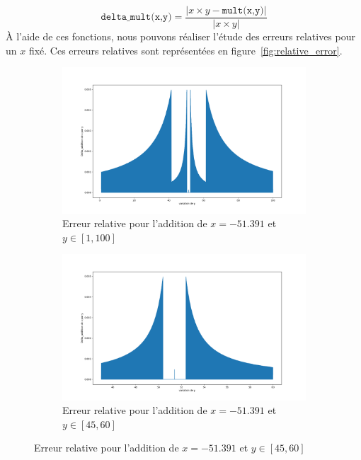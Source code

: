 \documentclass{article}
\begin{document}
\begin{equation}
  \texttt{delta\_mult(x,y)} = \dfrac{\big\vert x \times y - \texttt{mult(x,y)} \big\vert}{\big\vert x\times y \big\vert}
  \label{eq:delta_mult}
\end{equation}
À l'aide de ces fonctions, nous pouvons réaliser l'étude des erreurs relatives pour un $x$ fixé. Ces erreurs relatives sont représentées en figure~\ref{fig:relative_error}.
\vskip 1mm ~

\begin{figure}[ht]
  \centering
  \begin{subfigure}[b]{0.5\textwidth}
    \centering
    \includegraphics[width=\linewidth]{Partie1-delta_add_1-100.png}
    \caption{Erreur relative pour l'addition de $x = -51.391$ et $y\in[1,100]$}
    \label{subfig:delta_add_big}
  \end{subfigure}
  \hfill
  \begin{subfigure}[b]{0.5\textwidth}
    \centering
    \includegraphics[width=\linewidth]{Partie1-delta_add_45-60.png}
    \caption{Erreur relative pour l'addition de $x = -51.391$ et $y\in[45,60]$}

\end{subfigure}
\end{figure}
\end{document}
